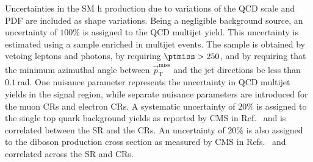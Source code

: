 Uncertainties in the SM h production due to variations of the QCD scale and PDF are included as shape variations. Being a negligible background source, an uncertainty of $100\%$ is assigned to the QCD multijet yield. This uncertainty is estimated using a sample enriched in multijet events. The sample is obtained by vetoing leptons and photons, by requiring $\ptmiss>250$\GeV, and by requiring that the minimum azimuthal angle between $\vec{p}_{\mathrm{T}}^{\mathrm{miss}}$ and the jet directions be less than $0.1$\,rad. One nuisance parameter represents the uncertainty in QCD multijet yields in the signal region, while separate nuisance parameters are introduced for the muon CRs and electron CRs. A systematic uncertainty of $20\%$ is assigned to the single top quark background yields as reported by CMS in Ref.~\cite{Chatrchyan:1642680} and is correlated between the SR and the CRs. An uncertainty of $20\%$ is also assigned to the diboson production cross section as measured by CMS in Refs.~\cite{Khachatryan:2016txa,Khachatryan:2016tgp} and correlated across the SR and CRs.



